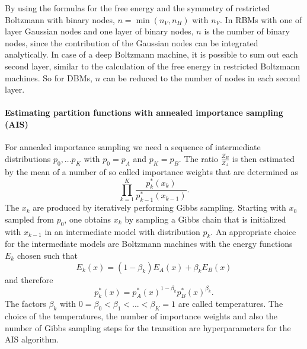 \documentclass[12pt]{article}
\begin{document}
By using the formulas for the free energy and the symmetry of restricted Boltzmann with binary nodes, $n = \min(n_V, n_H)$ with $n_V$.
In RBMs with one of layer Gaussian nodes and one layer of binary nodes, $n$ is the number of binary nodes, since the contribution of the Gaussian nodes can be integrated analytically.
In case of a deep Boltzmann machine, it is possible to sum out each second layer, similar to the calculation of the free energy in restricted Boltzmann machines. So for DBMs, $n$ can be reduced to the number of nodes in each second layer.

\paragraph{Estimating partition functions with annealed importance sampling (AIS)}\label{methodAIS}

For annealed importance sampling we need a sequence of intermediate distributions
$p_0, \dots p_K$ with
$p_0 = p_A$ and $p_K = p_B$. The ratio $\frac{Z_B}{Z_A}$ is then estimated by the mean of a number of so called importance weights that are determined as
\[
   \prod_{k=1}^K \frac{p^*_k(x_k)}{p^*_{k-1}(x_{k-1})}.
\]
The $x_k$ are produced by iteratively performing Gibbs sampling. Starting with $x_0$ sampled from $p_0$, one obtains $x_k$ by sampling a Gibbs chain that is initialized with $x_{k-1}$ in an intermediate model with distribution $p_k$. An appropriate choice for the intermediate models are Boltzmann machines with the energy functions $E_k$ chosen such that
\[
   E_k(x) = (1 - \beta_k) E_A(x) + \beta_k E_B(x)
\]
and therefore
\[
   p_k^*(x) = p_A^*(x)^{1-\beta_k} p_B^*(x)^{\beta_k}.
\]
The factors $\beta_k$ with $0 = \beta_0 < \beta_1 < ... < \beta_K = 1$ are called temperatures. \citep{salakhutdinov2008learning}
The choice of the temperatures, the number of importance weights and also the number of Gibbs sampling steps for the transition are hyperparameters for the AIS algorithm.
\end{document}
